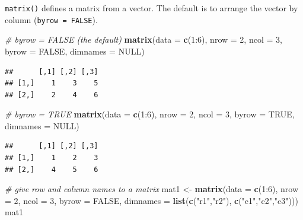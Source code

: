 \documentclass[]{book}
\newenvironment{Shaded}{\begin{snugshade}}{\end{snugshade}}
\newcommand{\KeywordTok}[1]{\textcolor[rgb]{0.13,0.29,0.53}{\textbf{{#1}}}}
\newcommand{\DataTypeTok}[1]{\textcolor[rgb]{0.13,0.29,0.53}{{#1}}}
\newcommand{\DecValTok}[1]{\textcolor[rgb]{0.00,0.00,0.81}{{#1}}}
\newcommand{\StringTok}[1]{\textcolor[rgb]{0.31,0.60,0.02}{{#1}}}
\newcommand{\CommentTok}[1]{\textcolor[rgb]{0.56,0.35,0.01}{\textit{{#1}}}}
\newcommand{\OtherTok}[1]{\textcolor[rgb]{0.56,0.35,0.01}{{#1}}}
\newcommand{\NormalTok}[1]{{#1}}
\theoremstyle{definition}
\theoremstyle{definition}
\theoremstyle{remark}
\begin{document}
\texttt{matrix()} defines a matrix from a vector. The default is to
arrange the vector by column (\texttt{byrow\ =\ FALSE}).

\begin{Shaded}
\begin{Highlighting}[]
\CommentTok{# byrow = FALSE  (the default)}
\KeywordTok{matrix}\NormalTok{(}\DataTypeTok{data =} \KeywordTok{c}\NormalTok{(}\DecValTok{1}\NormalTok{:}\DecValTok{6}\NormalTok{), }\DataTypeTok{nrow =} \DecValTok{2}\NormalTok{, }\DataTypeTok{ncol =} \DecValTok{3}\NormalTok{, }\DataTypeTok{byrow =} \OtherTok{FALSE}\NormalTok{, }\DataTypeTok{dimnames =} \OtherTok{NULL}\NormalTok{)}
\end{Highlighting}
\end{Shaded}

\begin{verbatim}
##      [,1] [,2] [,3]
## [1,]    1    3    5
## [2,]    2    4    6
\end{verbatim}

\begin{Shaded}
\begin{Highlighting}[]
\CommentTok{# byrow = TRUE }
\KeywordTok{matrix}\NormalTok{(}\DataTypeTok{data =} \KeywordTok{c}\NormalTok{(}\DecValTok{1}\NormalTok{:}\DecValTok{6}\NormalTok{), }\DataTypeTok{nrow =} \DecValTok{2}\NormalTok{, }\DataTypeTok{ncol =} \DecValTok{3}\NormalTok{, }\DataTypeTok{byrow =} \OtherTok{TRUE}\NormalTok{, }\DataTypeTok{dimnames =} \OtherTok{NULL}\NormalTok{)}
\end{Highlighting}
\end{Shaded}

\begin{verbatim}
##      [,1] [,2] [,3]
## [1,]    1    2    3
## [2,]    4    5    6
\end{verbatim}

\begin{Shaded}
\begin{Highlighting}[]
\CommentTok{# give row and column names to a matrix }
\NormalTok{mat1 <-}\StringTok{ }\KeywordTok{matrix}\NormalTok{(}\DataTypeTok{data =} \KeywordTok{c}\NormalTok{(}\DecValTok{1}\NormalTok{:}\DecValTok{6}\NormalTok{), }\DataTypeTok{nrow =} \DecValTok{2}\NormalTok{, }\DataTypeTok{ncol =} \DecValTok{3}\NormalTok{, }\DataTypeTok{byrow =} \OtherTok{FALSE}\NormalTok{, }
       \DataTypeTok{dimnames =} \KeywordTok{list}\NormalTok{(}\KeywordTok{c}\NormalTok{(}\StringTok{"r1"}\NormalTok{,}\StringTok{"r2"}\NormalTok{), }\KeywordTok{c}\NormalTok{(}\StringTok{"c1"}\NormalTok{,}\StringTok{"c2"}\NormalTok{,}\StringTok{"c3"}\NormalTok{)))}
\NormalTok{mat1}
\end{Highlighting}
\end{Shaded}
\end{document}
